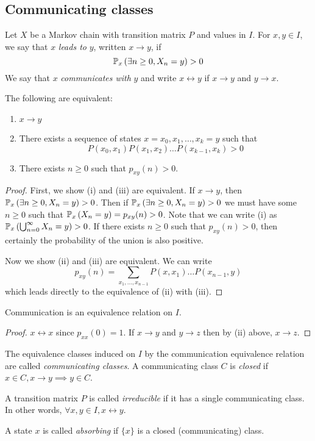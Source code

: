 \subsection{Communicating classes}
\begin{definition}
	Let \( X \) be a Markov chain with transition matrix \( P \) and values in \( I \).
	For \( x, y \in I \), we say that \( x \) \textit{leads to} \( y \), written \( x \to y \), if
	\[
		\mathbb{P}_{x}\left({\exists n \geq 0, X_n = y}\right) > 0
	\]
	We say that \( x \) \textit{communicates with} \( y \) and write \( x \leftrightarrow y \) if \( x \to y \) and \( y \to x \).
\end{definition}
\begin{theorem}
	The following are equivalent:
	\begin{enumerate}
		\item \( x \to y \)
		\item There exists a sequence of states \( x = x_0, x_1, \dots, x_k = y \) such that
		      \[
			      P(x_0, x_1)P(x_1,x_2)\dots P(x_{k-1},x_k) > 0
		      \]
		\item There exists \( n \geq 0 \) such that \( p_{xy}(n) > 0 \).
	\end{enumerate}
\end{theorem}
\begin{proof}
	First, we show (i) and (iii) are equivalent.
	If \( x \to y \), then \( \mathbb{P}_{x}\left({\exists n \geq 0, X_n = y}\right) > 0 \).
	Then if \( \mathbb{P}_{x}\left({\exists n \geq 0, X_n = y}\right) > 0 \) we must have some \( n \geq 0 \) such that \( \mathbb{P}_{x}\left({X_n = y}\right) = p_{xy}(n) > 0 \).
	Note that we can write (i) as \( \mathbb{P}_{x}\left({\bigcup_{n=0}^\infty X_n = y}\right) > 0 \).
	If there exists \( n \geq 0 \) such that \( p_{xy}(n) > 0 \), then certainly the probability of the union is also positive.

	Now we show (ii) and (iii) are equivalent.
	We can write
	\[
		p_{xy}(n) = \sum_{x_1, \dots, x_{n-1}} P(x, x_1) \dots P(x_{n-1}, y)
	\]
	which leads directly to the equivalence of (ii) with (iii).
\end{proof}
\begin{corollary}
	Communication is an equivalence relation on \( I \).
\end{corollary}
\begin{proof}
	\( x \leftrightarrow x \) since \( p_{xx}(0) = 1 \).
	If \( x \to y \) and \( y \to z \) then by (ii) above, \( x \to z \).
\end{proof}
\begin{definition}
	The equivalence classes induced on \( I \) by the communication equivalence relation are called \textit{communicating classes}.
	A communicating class \( C \) is \textit{closed} if \( x \in C, x \to y \implies y \in C \).
\end{definition}
\begin{definition}
	A transition matrix \( P \) is called \textit{irreducible} if it has a single communicating class.
	In other words, \( \forall x, y \in I, x \leftrightarrow y \).
\end{definition}
\begin{definition}
	A state \( x \) is called \textit{absorbing} if \( \{ x \} \) is a closed (communicating) class.
\end{definition}

